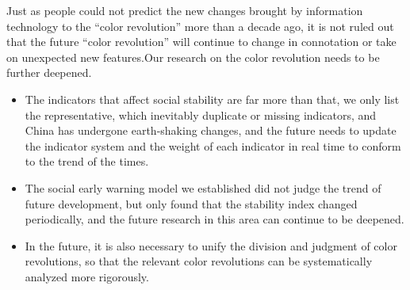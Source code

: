 \documentclass[12pt]{article}  %
\begin{document}
Just as people could not predict the new changes brought by information technology to the ``color revolution'' more than a decade ago, it is not ruled out that the future ``color revolution'' will continue to change in connotation or take on unexpected new features.Our research on the color revolution needs to be further deepened.
\begin{itemize}
	\item The indicators that affect social stability are far more than that, we only list the representative, which inevitably duplicate or missing indicators, and China has undergone earth-shaking changes, and the future needs to update the indicator system and the weight of each indicator in real time to conform to the trend of the times.
	\item The social early warning model we established did not judge the trend of future development, but only found that the stability index changed periodically, and the future research in this area can continue to be deepened.
	\item In the future, it is also necessary to unify the division and judgment of color revolutions, so that the relevant color revolutions can be systematically analyzed more rigorously.
\end{itemize}























































\end{document}
